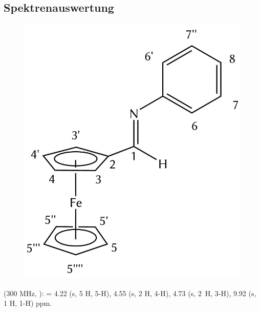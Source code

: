 \documentclass[12pt]{article}
\begin{document}
\begin{onehalfspace}
\section{Spektrenauswertung}
\begin{figure}[!ht]
   \centering
\includegraphics[scale=0.3]{auswert.png}
\end{figure}
\noindent
\textbf{} (300 MHz, ): \ce{$\delta$} = 
4.22 (s, 5 H, 5-H),
4.55 (s, 2 H, 4-H),
4.73 (s, 2~H, 3-H),
9.92 (s, 1 H, 1-H) ppm.

\end{onehalfspace}
\end{document}
